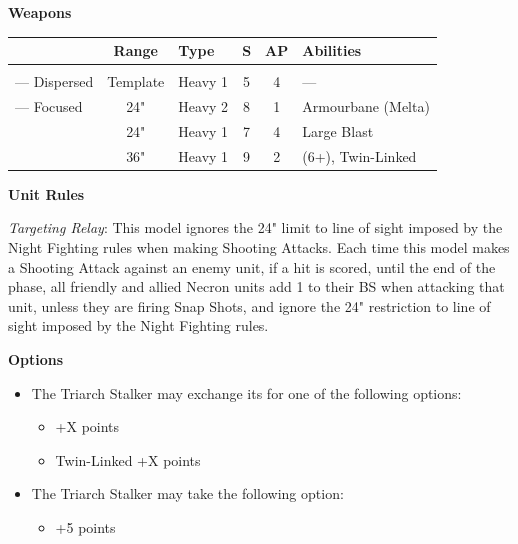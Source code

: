 \begin{minipage}[t]{0.72\textwidth}
	
	\vspace*{2em}
	\textbf{Weapons}
	
	\begin{tabular}{L{90 pt} c C{40pt} *{2}{c} >{\raggedright\arraybackslash}p{130pt}}
		& Range & Type & S & AP & Abilities \\
		\hline
		 &  &  & &  &  \\
		— Dispersed & Template & Heavy 1 & 5 & 4 & — \\
		— Focused & 24" & Heavy 2 & 8 & 1 & Armourbane (Melta) \\
		 & 24" & Heavy 1 & 7 & 4 & Large Blast \\
		 & 36" & Heavy 1 & 9 & 2 &  (6+), Twin-Linked \\
	\end{tabular}
	
	\vspace*{2em}
	\textbf{Unit Rules}
	
	\textit{Targeting Relay}: This model ignores the 24" limit to line of sight imposed by the Night Fighting rules when making Shooting Attacks. Each time this model makes a Shooting Attack against an enemy unit, if a hit is scored, until the end of the phase, all friendly and allied Necron units add 1 to their BS when attacking that unit, unless they are firing Snap Shots, and ignore the 24" restriction to line of sight imposed by the Night Fighting rules. 
		
	\vspace*{2em}
	\textbf{Options}
	\begin{itemize}
		\item The Triarch Stalker may exchange its  for one of the following options:
		\begin{itemize}
			\item {} \dotfill +X points
			\item Twin-Linked  \dotfill +X points
		\end{itemize}
		\item The Triarch Stalker may take the following option:
		\begin{itemize}
			\item {} \dotfill +5 points
		\end{itemize} 
	\end{itemize}
\end{minipage}
